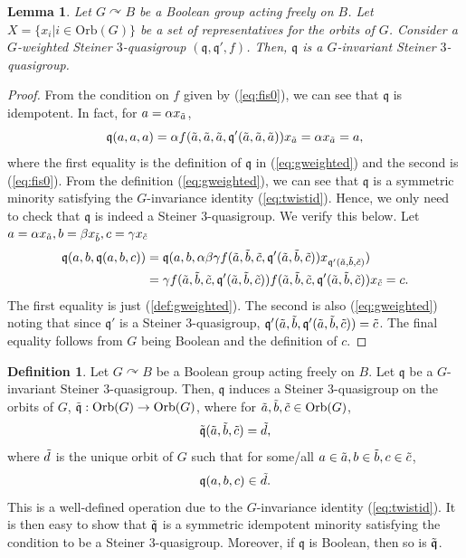 \documentclass{article}
\newtheorem{lemma}[theorem]{Lemma}
\theoremstyle{remark}
\theoremstyle{definition}
\newtheorem{definition}[theorem]{Definition}
\def\acts{\curvearrowright}
\begin{document}
\begin{lemma}\label{misgtwisted} Let $G\acts B$ be a Boolean group acting freely on $B$. Let $X=\{ x_i \vert i\in \mathrm{Orb}(G)\}$ be a set of representatives for the orbits of $G$. Consider a $G$-weighted Steiner $3$-quasigroup $(\mathfrak{q}, \mathfrak{q}', f)$. Then, $\mathfrak{q}$ is a $G$-invariant Steiner $3$-quasigroup.
\end{lemma}
\begin{proof} From the condition on $f$ given by (\ref{eq:fis0}), we can see that $\mathfrak{q}$ is idempotent. In fact, for $a=\alpha x_{\Tilde{a}}$,
\begin{equation*}
    \mathfrak{q}(a, a, a)=\alpha f(\Tilde{a}, \Tilde{a}, \Tilde{a}, \mathfrak{q}'(\Tilde{a}, \Tilde{a}, \Tilde{a})) x_{\Tilde{a}}=\alpha x_{\Tilde{a}}=a,
\end{equation*}
where the first equality is the definition of $\mathfrak{q}$ in  (\ref{eq:gweighted}) and the second is (\ref{eq:fis0}). From the definition (\ref{eq:gweighted}), we can see that $\mathfrak{q}$ is a symmetric minority satisfying the $G$-invariance identity (\ref{eq:twistid}). Hence, we only need to check that $\mathfrak{q}$ is indeed a Steiner $3$-quasigroup. We verify this below. Let $a=\alpha x_{\Tilde{a}}, b=\beta x_{\Tilde{b}}, c=\gamma x_{\Tilde{c}}$
\begin{align*}
    \mathfrak{q}(a, b, \mathfrak{q}(a, b, c))&=\mathfrak{q}(a, b, \alpha \beta \gamma f(\Tilde{a},\Tilde{b}, \Tilde{c}, \mathfrak{q}'(\Tilde{a},\Tilde{b}, \Tilde{c})) x_{\mathfrak{q}'(\Tilde{a},\Tilde{b}, \Tilde{c})})\\
    &=\gamma  f(\Tilde{a},\Tilde{b}, \Tilde{c}, \mathfrak{q}'(\Tilde{a},\Tilde{b}, \Tilde{c})) f(\Tilde{a},\Tilde{b}, \Tilde{c}, \mathfrak{q}'(\Tilde{a},\Tilde{b}, \Tilde{c})) x_{\Tilde{c}}=c.
\end{align*}
The first equality is just (\ref{def:gweighted}). The second is also  (\ref{eq:gweighted}) noting that since $\mathfrak{q}'$ is a Steiner $3$-quasigroup,  $\mathfrak{q}'(\Tilde{a},\Tilde{b},\mathfrak{q}'(\Tilde{a},\Tilde{b}, \Tilde{c}))=\Tilde{c}$. The final equality follows from $G$ being Boolean and the definition of $c$. 
\end{proof}

\begin{definition}\label{def:inducedmin} Let $G\acts B$ be a Boolean group acting freely on $B$. Let $\mathfrak{q}$ be a $G$-invariant Steiner $3$-quasigroup. Then, $\mathfrak{q}$ induces a Steiner $3$-quasigroup on the orbits of $G$, $\Tilde{\mathfrak{q}}:\mathrm{Orb}(G)\to \mathrm{Orb}(G)$, where for $\Tilde{a}, \Tilde{b}, \Tilde{c}\in\mathrm{Orb}(G)$, 
\[\Tilde{\mathfrak{q}}(\Tilde{a}, \Tilde{b}, \Tilde{c})=\Tilde{d},\]
where $\Tilde{d}$ is the unique orbit of $G$ such that for some/all $a\in\Tilde{a}, b\in\Tilde{b}, c\in\Tilde{c}$, 
\[\mathfrak{q}(a, b, c)\in \Tilde{d}.\]
This is a well-defined operation due to the $G$-invariance identity (\ref{eq:twistid}). It is then easy to show that $\Tilde{\mathfrak{q}}$ is a symmetric idempotent minority satisfying the condition to be a Steiner $3$-quasigroup. Moreover, if $\mathfrak{q}$ is Boolean, then so is $\Tilde{\mathfrak{q}}$.
\end{definition}
\end{document}
